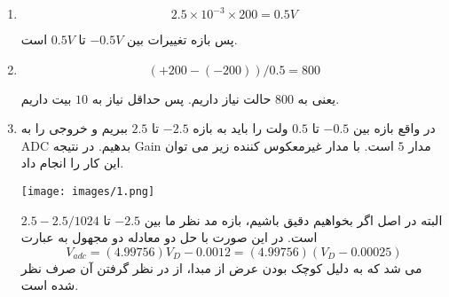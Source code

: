 \documentclass[12pt]{article}
\begin{document}
\begin{enumerate}
	\item 
	
	
	$$2.5 \times 10^{-3} \times 200 = 0.5V$$
	
	پس بازه تغییرات بین $-0.5V$ تا $0.5V$ است.

\item

$$(+ 200 - (-200)) / 0.5 =800$$

یعنی به $800$ حالت نیاز داریم. پس حداقل نیاز به $10$ بیت داریم.


\item

در واقع بازه بین $-0.5$ تا $0.5$ ولت را باید به بازه $-2.5$ تا $2.5$ ببریم و خروجی را به ADC بدهیم. در نتیجه Gain مدار $5$ است. با مدار غیرمعکوس کننده زیر می توان این کار را انجام داد.

\begin{center}
	\texttt{[image: images/1.png]}
\end{center}	

البته در اصل اگر بخواهیم دقیق باشیم، بازه مد نظر ما بین $-2.5$ تا $2.5 -2.5/1024$ است. در این صورت با حل دو معادله دو مجهول به عبارت
$$V_{adc} = (4.99756) V_{D} - 0.0012 =(4.99756)(V_{D} - 0.00025) $$
می شد که به دلیل کوچک بودن عرض از مبدا، از در نظر گرفتن آن صرف نظر شده است.
\end{enumerate}
\end{document}
